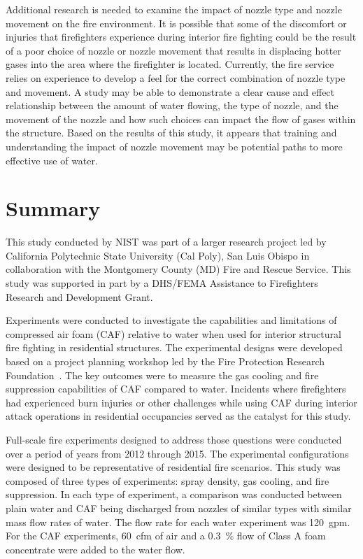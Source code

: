 \documentclass[12pt,oneside]{book}
\begin{document}
Additional research is needed to examine the impact of nozzle type and nozzle movement on the fire environment. It is possible that some of the discomfort or injuries that firefighters experience during interior fire fighting could be the result of a poor choice of nozzle or nozzle movement that results in displacing hotter gases into the area where the firefighter is located. Currently, the fire service relies on experience to develop a feel for the correct combination of nozzle type and movement. A study may be able to demonstrate a clear cause and effect relationship between the amount of water flowing, the type of nozzle, and the movement of the nozzle and how such choices can impact the flow of gases within the structure. Based on the results of this study, it appears that training and understanding the impact of nozzle movement may be potential paths to more effective use of water. 

\chapter{Summary}
\label{chap:Summary}

This study conducted by NIST was part of a larger research project led by California Polytechnic State University (Cal Poly), San Luis Obispo in collaboration with the Montgomery County (MD) Fire and Rescue Service. This study was supported in part by a DHS/FEMA Assistance to Firefighters Research and Development Grant.  

Experiments were conducted to investigate the capabilities and limitations of compressed air foam (CAF) relative to water when used for interior structural fire fighting in residential structures. The experimental designs were developed based on a project planning workshop led by the Fire Protection Research Foundation~\cite{Grant:2011}. The key outcomes were to measure the gas cooling and fire suppression capabilities of CAF compared to water. Incidents where firefighters had experienced burn injuries or other challenges while using CAF during interior attack operations in residential occupancies served as the catalyst for this study.

Full-scale fire experiments designed to address those questions were conducted over a period of years from 2012 through 2015. The experimental configurations were designed to be representative of residential fire scenarios. %
This study was composed of three types of experiments: spray density, gas cooling, and fire suppression. In each type of experiment, a comparison was conducted between plain water and CAF being discharged from nozzles of similar types with similar mass flow rates of water. The flow rate for each water experiment was 120~gpm. For the CAF experiments, 60~cfm of air and a 0.3~\% flow of Class A foam concentrate were added to the water flow.
\end{document}
